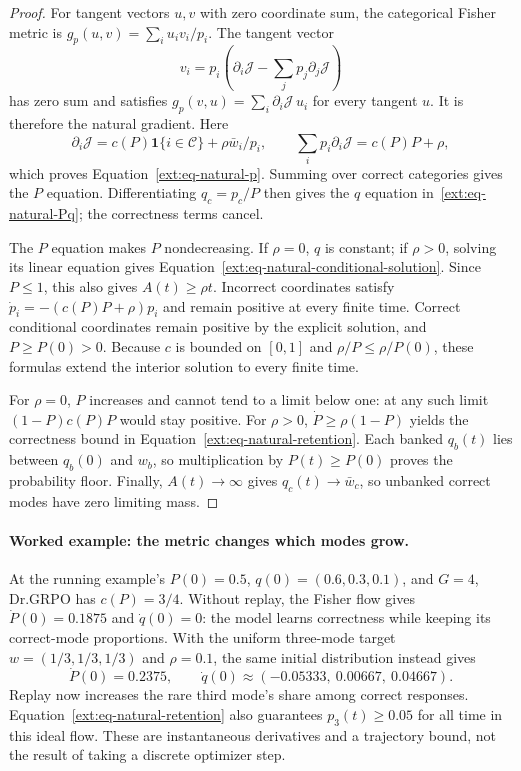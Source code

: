 \begin{proof}
For tangent vectors $u,v$ with zero coordinate sum, the categorical Fisher
metric is $g_p(u,v)=\sum_i u_iv_i/p_i$. The tangent vector
\[
 v_i=p_i\left(\partial_i\mathcal J-
                  \sum_jp_j\partial_j\mathcal J\right)
\]
has zero sum and satisfies $g_p(v,u)=\sum_i\partial_i\mathcal J\,u_i$
for every tangent $u$. It is therefore the natural gradient. Here
\[
 \partial_i\mathcal J=c(P)\mathbf 1\{i\in\mathcal C\}
                   +\rho\bar w_i/p_i,
 \qquad
 \sum_i p_i\partial_i\mathcal J=c(P)P+\rho,
\]
which proves Equation~\eqref{ext:eq-natural-p}. Summing over correct
categories gives the $P$ equation. Differentiating $q_c=p_c/P$ then gives
the $q$ equation in~\eqref{ext:eq-natural-Pq}; the correctness terms cancel.

The $P$ equation makes $P$ nondecreasing. If $\rho=0$, $q$ is constant;
if $\rho>0$, solving its linear equation gives
Equation~\eqref{ext:eq-natural-conditional-solution}. Since $P\le1$, this
also gives $A(t)\ge\rho t$. Incorrect coordinates satisfy
$\dot p_i=-(c(P)P+\rho)p_i$ and remain positive at every finite time.
Correct conditional coordinates remain positive by the explicit solution,
and $P\ge P(0)>0$. Because $c$ is bounded on $[0,1]$ and
$\rho/P\le\rho/P(0)$, these formulas extend the interior solution to every
finite time.

For $\rho=0$, $P$ increases and cannot tend to a limit below one: at any
such limit $(1-P)c(P)P$ would stay positive. For $\rho>0$,
$\dot P\ge\rho(1-P)$ yields the correctness bound in
Equation~\eqref{ext:eq-natural-retention}. Each banked $q_b(t)$ lies between
$q_b(0)$ and $w_b$, so multiplication by $P(t)\ge P(0)$ proves the
probability floor. Finally, $A(t)\to\infty$ gives $q_c(t)\to\bar w_c$, so unbanked
correct modes have zero limiting mass.
\end{proof}

\paragraph{Worked example: the metric changes which modes grow.}
At the running example's $P(0)=0.5$, $q(0)=(0.6,0.3,0.1)$, and $G=4$,
Dr.GRPO has $c(P)=3/4$. Without replay, the Fisher flow gives
$\dot P(0)=0.1875$ and $\dot q(0)=0$: the model learns correctness while
keeping its correct-mode proportions. With the uniform three-mode target
$w=(1/3,1/3,1/3)$ and $\rho=0.1$, the same initial distribution instead gives
\[
 \dot P(0)=0.2375,\qquad
 \dot q(0)\approx(-0.05333,\ 0.00667,\ 0.04667).
\]
Replay now increases the rare third mode's share among correct responses.
Equation~\eqref{ext:eq-natural-retention} also guarantees $p_3(t)\ge0.05$
for all time in this ideal flow. These are instantaneous derivatives and a
trajectory bound, not the result of taking a discrete optimizer step.

